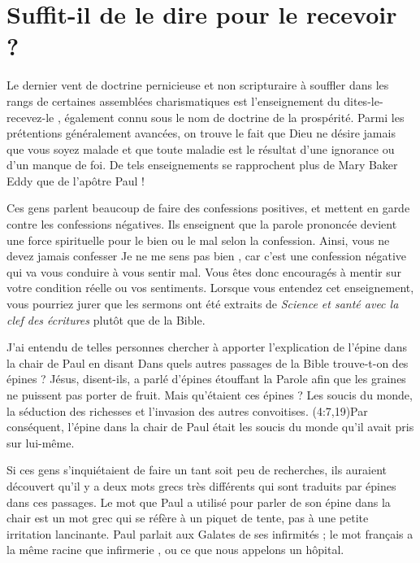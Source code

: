 \section{Suffit-il de le dire pour le recevoir ?}

Le dernier vent de doctrine pernicieuse et non scripturaire à \linebreak
 souffler dans les rangs de certaines assemblées charismatiques
 est l'en\-sei\-gne\-ment du \Og dites-le-recevez-le \Fg{},
 également connu sous le nom de doctrine de la prospérité.
 Parmi les prétentions généralement avancées, on trouve le fait
 que Dieu ne désire jamais que vous soyez malade et que toute maladie
 est le résultat d'une ignorance ou d'un manque de foi.
 De tels enseignements se rapprochent plus de Mary Baker Eddy
 que de l'apôtre Paul !

Ces gens parlent beaucoup de faire des confessions positives,
 et mettent en garde contre les confessions négatives.
 Ils enseignent que la parole prononcée devient une force spirituelle
 pour le bien ou le mal selon la confession.
 Ainsi, vous ne devez jamais confesser\frcolon{} \Og Je ne me sens pas bien \Fg{},
 car c'est une confession négative qui va vous conduire à vous sentir mal.
 Vous êtes donc encouragés à mentir sur votre condition réelle
 ou vos sentiments. Lorsque vous entendez cet enseignement,
 vous pourriez jurer que les sermons ont été extraits
 de \emph{Science et santé avec la clef des écritures}
  plutôt que de la Bible.

J'ai entendu de telles personnes chercher à apporter l'explication
 de l'épine dans la chair de Paul en disant\frcolon{}
 \Og Dans quels autres passages de la Bible trouve-t-on des épines ?
 Jésus, disent-ils, a parlé d'épines étouffant la Parole afin
 que les graines ne puissent pas porter de fruit. \Fg{}
 Mais qu'étaient ces épines ? Les soucis du monde,
 la séduction des richesses et l'invasion des autres convoitises.
 (4:7,19)Par conséquent, l'épine dans la chair de Paul
 était les soucis du monde qu'il avait pris sur lui-même.

Si ces gens s'inquiétaient de faire un tant soit peu de recherches,
 ils auraient découvert qu'il y a deux mots grecs très différents
 qui sont traduits par \Og épines \Fg{} dans ces passages.
 Le mot que Paul a utilisé pour parler de son épine dans la chair
 est un mot grec qui se réfère à un piquet de tente,
 pas à une petite irritation lancinante.
 Paul parlait aux Galates de ses infirmités ;
 le mot français a la même racine que \Og infirmerie \Fg{},
 ou ce que nous appelons un hôpital.

